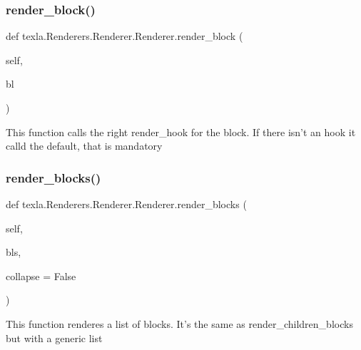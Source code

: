 \subsubsection{\texorpdfstring{render\+\_\+block()}{render\_block()}}
{\footnotesize\ttfamily def texla.\+Renderers.\+Renderer.\+Renderer.\+render\+\_\+block (\begin{DoxyParamCaption}\item[{}]{self,  }\item[{}]{bl }\end{DoxyParamCaption})}

\begin{DoxyVerb}This function calls the right render_hook for
the block. If there isn't an hook it calld the default,
that is mandatory\end{DoxyVerb}
 \hypertarget{classtexla_1_1Renderers_1_1Renderer_1_1Renderer_af8fccb30690606612e6c62851cd899fe}{}\label{classtexla_1_1Renderers_1_1Renderer_1_1Renderer_af8fccb30690606612e6c62851cd899fe} 
\subsubsection{\texorpdfstring{render\+\_\+blocks()}{render\_blocks()}}
{\footnotesize\ttfamily def texla.\+Renderers.\+Renderer.\+Renderer.\+render\+\_\+blocks (\begin{DoxyParamCaption}\item[{}]{self,  }\item[{}]{bls,  }\item[{}]{collapse = {\ttfamily False} }\end{DoxyParamCaption})}

\begin{DoxyVerb}This function renderes a list of blocks.
It's the same as render_children_blocks but
with a generic list\end{DoxyVerb}
 \hypertarget{classtexla_1_1Renderers_1_1Renderer_1_1Renderer_a3fda0b658f6e8b0215e2d9062d0f0893}{}\label{classtexla_1_1Renderers_1_1Renderer_1_1Renderer_a3fda0b658f6e8b0215e2d9062d0f0893} 
